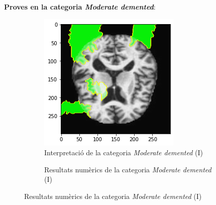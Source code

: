 \documentclass[a4paper,12pt]{report}
\begin{document}
\textbf{Proves en la categoria \textit{Moderate demented}}:
\begin{figure}[h!]
    \centering
    \begin{subfigure}[b]{0.40\linewidth}
        \includegraphics[width=\linewidth]{images/Moderately demented.png}
        \caption{Interpretació de la categoria \textit{Moderate demented} (I)}
        \label{fig:ModD1}
    \end{subfigure}
    \begin{subfigure}[b]{0.40\linewidth}
        \caption{Resultats numèrics de la categoria \textit{Moderate demented} (I)}

\end{subfigure}
\end{figure}
\end{document}
